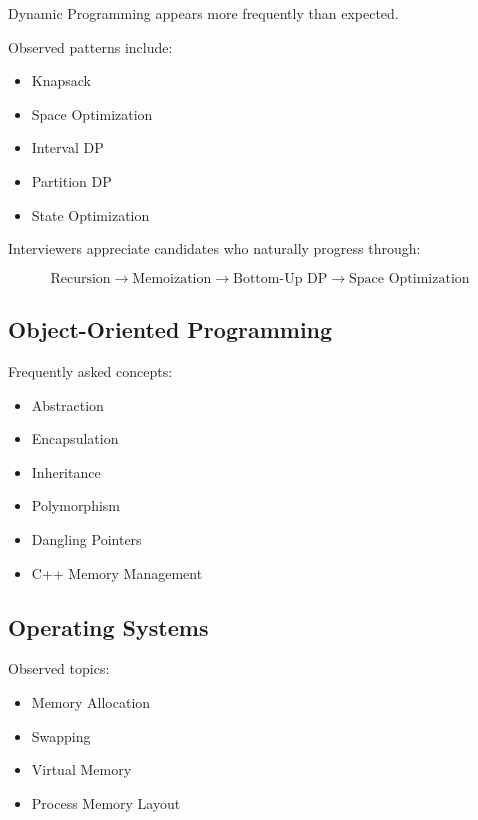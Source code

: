 \documentclass[11pt,a4paper]{article}
\begin{document}
Dynamic Programming appears more frequently than expected.

Observed patterns include:

\begin{itemize}
	\item Knapsack
	\item Space Optimization
	\item Interval DP
	\item Partition DP
	\item State Optimization
\end{itemize}

Interviewers appreciate candidates who naturally progress through:

\[
\text{Recursion}
\rightarrow
\text{Memoization}
\rightarrow
\text{Bottom-Up DP}
\rightarrow
\text{Space Optimization}
\]


\subsection{Object-Oriented Programming}

Frequently asked concepts:

\begin{itemize}
	\item Abstraction
	\item Encapsulation
	\item Inheritance
	\item Polymorphism
	\item Dangling Pointers
	\item C++ Memory Management
\end{itemize}


\subsection{Operating Systems}

Observed topics:

\begin{itemize}
	\item Memory Allocation
	\item Swapping
	\item Virtual Memory
	\item Process Memory Layout
\end{itemize}
\end{document}
